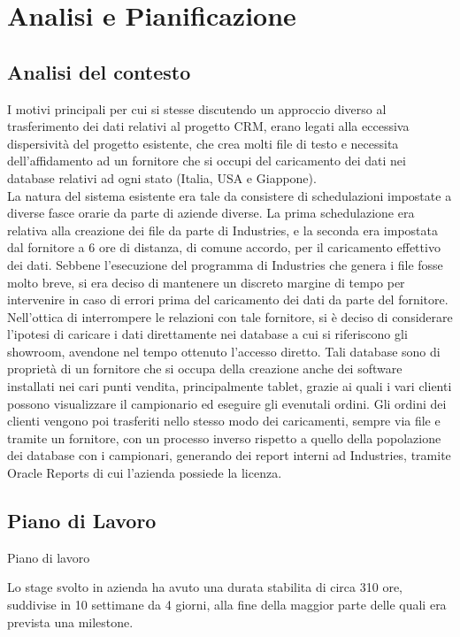 \section{Analisi e Pianificazione}
\subsection{Analisi del contesto}
I motivi principali per cui si stesse discutendo un approccio diverso al trasferimento dei dati relativi al progetto CRM, erano legati alla eccessiva dispersività del progetto esistente, che crea molti file di testo e necessita dell'affidamento ad un fornitore che si occupi del caricamento dei dati nei database relativi ad ogni stato (Italia, USA e Giappone).\\
La natura del sistema esistente era tale da consistere di schedulazioni impostate a diverse fasce orarie da parte di aziende diverse. La prima schedulazione era relativa alla creazione dei file da parte di Industries, e la seconda era impostata dal fornitore a 6 ore di distanza, di comune accordo, per il caricamento effettivo dei dati. Sebbene l'esecuzione del programma di Industries che genera i file fosse molto breve, si era deciso di mantenere un discreto margine di tempo per intervenire in caso di errori prima del caricamento dei dati da parte del fornitore.\\
Nell'ottica di interrompere le relazioni con tale fornitore, si è deciso di considerare l'ipotesi di caricare i dati direttamente nei database a cui si riferiscono gli showroom, avendone nel tempo ottenuto l'accesso diretto. Tali database sono di proprietà di un fornitore che si occupa della creazione anche dei software installati nei cari punti vendita, principalmente tablet, grazie ai quali i vari clienti possono visualizzare il campionario ed eseguire gli evenutali ordini. Gli ordini dei clienti vengono poi trasferiti nello stesso modo dei caricamenti, sempre via file e tramite un fornitore, con un processo inverso rispetto a quello della popolazione dei database con i campionari, generando dei report interni ad Industries, tramite Oracle Reports di cui l'azienda possiede la licenza.

\subsection{Piano di Lavoro}
 Piano di lavoro

Lo stage svolto in azienda ha avuto una durata stabilita di circa 310 ore, suddivise in 10 settimane da 4 giorni, alla fine della maggior parte delle quali era prevista una milestone.
\newpage
